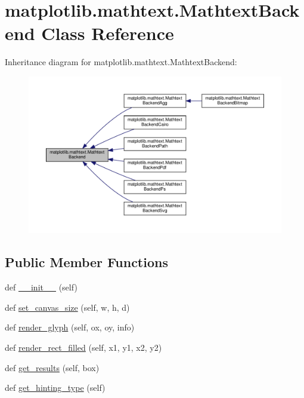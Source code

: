 \hypertarget{classmatplotlib_1_1mathtext_1_1MathtextBackend}{}\section{matplotlib.\+mathtext.\+Mathtext\+Backend Class Reference}
\label{classmatplotlib_1_1mathtext_1_1MathtextBackend}


Inheritance diagram for matplotlib.\+mathtext.\+Mathtext\+Backend\+:
\nopagebreak
\begin{figure}[H]
\begin{center}
\leavevmode
\includegraphics[width=350pt]{classmatplotlib_1_1mathtext_1_1MathtextBackend__inherit__graph}
\end{center}
\end{figure}
\subsection*{Public Member Functions}
\begin{DoxyCompactItemize}
\item 
def \hyperlink{classmatplotlib_1_1mathtext_1_1MathtextBackend_a11b11ee83093b7f054b23afea850c583}{\+\_\+\+\_\+init\+\_\+\+\_\+} (self)
\item 
def \hyperlink{classmatplotlib_1_1mathtext_1_1MathtextBackend_a384aa41ed05bd94734ba0ddefb01a062}{set\+\_\+canvas\+\_\+size} (self, w, h, d)
\item 
def \hyperlink{classmatplotlib_1_1mathtext_1_1MathtextBackend_ad8202b1bd3ffcfab70e8a6ebde875e53}{render\+\_\+glyph} (self, ox, oy, info)
\item 
def \hyperlink{classmatplotlib_1_1mathtext_1_1MathtextBackend_ad6ed2ad494da028610ccdaf7c69b439a}{render\+\_\+rect\+\_\+filled} (self, x1, y1, x2, y2)
\item 
def \hyperlink{classmatplotlib_1_1mathtext_1_1MathtextBackend_a5e597cc67478f25db0a6146787eba318}{get\+\_\+results} (self, box)
\item 
def \hyperlink{classmatplotlib_1_1mathtext_1_1MathtextBackend_a82a25dc7f2bd4b4f7909f8193025de67}{get\+\_\+hinting\+\_\+type} (self)
\end{DoxyCompactItemize}
